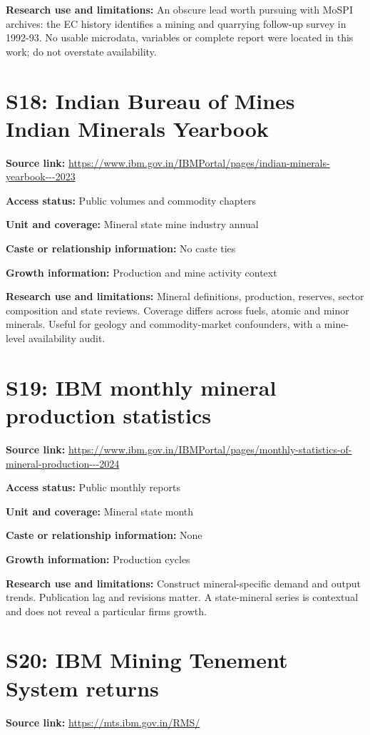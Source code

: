 \documentclass[11pt,a4paper]{report}
\begin{document}
\textbf{Research use and limitations:} An obscure lead worth pursuing with MoSPI archives: the EC history identifies a mining and quarrying follow-up survey in 1992-93. No usable microdata, variables or complete report were located in this work; do not overstate availability.

\section{S18: Indian Bureau of Mines Indian Minerals Yearbook}\hypertarget{S18}{}
\textbf{Source link:} \url{https://www.ibm.gov.in/IBMPortal/pages/indian-minerals-yearbook---2023}

\textbf{Access status:} Public volumes and commodity chapters

\textbf{Unit and coverage:} Mineral state mine industry annual

\textbf{Caste or relationship information:} No caste ties

\textbf{Growth information:} Production and mine activity context

\textbf{Research use and limitations:} Mineral definitions, production, reserves, sector composition and state reviews. Coverage differs across fuels, atomic and minor minerals. Useful for geology and commodity-market confounders, with a mine-level availability audit.

\section{S19: IBM monthly mineral production statistics}\hypertarget{S19}{}
\textbf{Source link:} \url{https://www.ibm.gov.in/IBMPortal/pages/monthly-statistics-of-mineral-production---2024}

\textbf{Access status:} Public monthly reports

\textbf{Unit and coverage:} Mineral state month

\textbf{Caste or relationship information:} None

\textbf{Growth information:} Production cycles

\textbf{Research use and limitations:} Construct mineral-specific demand and output trends. Publication lag and revisions matter. A state-mineral series is contextual and does not reveal a particular firms growth.

\section{S20: IBM Mining Tenement System returns}\hypertarget{S20}{}
\textbf{Source link:} \url{https://mts.ibm.gov.in/RMS/}
\end{document}
